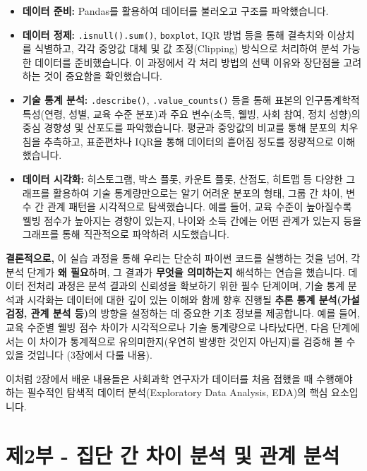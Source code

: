 \documentclass[
  letterpaper,
]{book}
\providecommand{\tightlist}{%
  \setlength{\itemsep}{0pt}\setlength{\parskip}{0pt}}
\begin{document}
\begin{itemize}
\tightlist
\item
  \textbf{데이터 준비:} Pandas를 활용하여 데이터를 불러오고 구조를
  파악했습니다.
\item
  \textbf{데이터 정제:} \texttt{.isnull().sum()}, \texttt{boxplot}, IQR
  방법 등을 통해 결측치와 이상치를 식별하고, 각각 중앙값 대체 및 값
  조정(Clipping) 방식으로 처리하여 분석 가능한 데이터를 준비했습니다. 이
  과정에서 각 처리 방법의 선택 이유와 장단점을 고려하는 것이 중요함을
  확인했습니다.
\item
  \textbf{기술 통계 분석:} \texttt{.describe()},
  \texttt{.value\_counts()} 등을 통해 표본의 인구통계학적 특성(연령,
  성별, 교육 수준 분포)과 주요 변수(소득, 웰빙, 사회 참여, 정치 성향)의
  중심 경향성 및 산포도를 파악했습니다. 평균과 중앙값의 비교를 통해
  분포의 치우침을 추측하고, 표준편차나 IQR을 통해 데이터의 흩어짐 정도를
  정량적으로 이해했습니다.
\item
  \textbf{데이터 시각화:} 히스토그램, 박스 플롯, 카운트 플롯, 산점도,
  히트맵 등 다양한 그래프를 활용하여 기술 통계량만으로는 알기 어려운
  분포의 형태, 그룹 간 차이, 변수 간 관계 패턴을 시각적으로
  탐색했습니다. 예를 들어, 교육 수준이 높아질수록 웰빙 점수가 높아지는
  경향이 있는지, 나이와 소득 간에는 어떤 관계가 있는지 등을 그래프를
  통해 직관적으로 파악하려 시도했습니다.
\end{itemize}

\textbf{결론적으로,} 이 실습 과정을 통해 우리는 단순히 파이썬 코드를
실행하는 것을 넘어, 각 분석 단계가 \textbf{왜 필요}하며, 그 결과가
\textbf{무엇을 의미하는지} 해석하는 연습을 했습니다. 데이터 전처리
과정은 분석 결과의 신뢰성을 확보하기 위한 필수 단계이며, 기술 통계
분석과 시각화는 데이터에 대한 깊이 있는 이해와 함께 향후 진행될
\textbf{추론 통계 분석(가설 검정, 관계 분석 등)}의 방향을 설정하는 데
중요한 기초 정보를 제공합니다. 예를 들어, 교육 수준별 웰빙 점수 차이가
시각적으로나 기술 통계량으로 나타났다면, 다음 단계에서는 이 차이가
통계적으로 유의미한지(우연히 발생한 것인지 아닌지)를 검증해 볼 수 있을
것입니다 (3장에서 다룰 내용).

이처럼 2장에서 배운 내용들은 사회과학 연구자가 데이터를 처음 접했을 때
수행해야 하는 필수적인 탐색적 데이터 분석(Exploratory Data Analysis,
EDA)의 핵심 요소입니다.

\part{제2부 - 집단 간 차이 분석 및 관계 분석}
\end{document}
